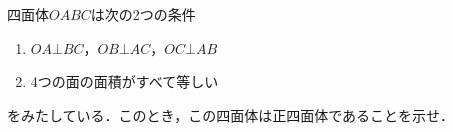 \documentclass[../../main.tex]{subfiles}
\begin{document}
四面体$OABC$は次の2つの条件
\begin{enumerate}
  \item $OA \bot BC$，$OB \bot AC$，$OC \bot AB$
  \item 4つの面の面積がすべて等しい
\end{enumerate}
をみたしている．このとき，この四面体は正四面体であることを示せ．
\end{document}
